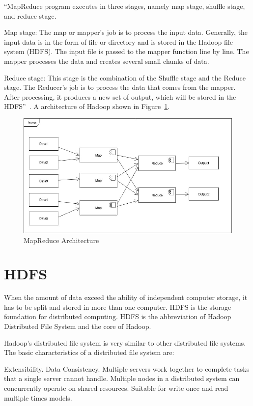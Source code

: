 ``MapReduce program executes in three stages, namely map stage, shuffle stage, 
and reduce stage.

Map stage: The map or mapper's job is to process the input data. Generally, the 
input data is in the form of file or directory and is stored in the Hadoop file 
system (HDFS). The input file is passed to the mapper function line by line. The 
mapper processes the data and creates several small chunks of data.

Reduce stage: This stage is the combination of the Shuffle stage and the Reduce 
stage. The Reducer's job is to process the data that comes from the mapper. After 
processing, it produces a new set of output, which will be stored in the HDFS''~\cite{hid-sp18-508-mapreduce}.
A architecture of Hadoop shown in Figure~\ref{f:fly}.

\begin{figure}[!ht]
  \centering\includegraphics[width=\columnwidth]{images/mapReduce.jpg}
  \caption{MapReduce Architecture}\label{f:fly}
\end{figure}

\section{HDFS}
When the amount of data exceed the ability of independent computer storage, it 
has to be split and stored in more than one computer. HDFS is the storage 
foundation for distributed computing. HDFS is the abbreviation of Hadoop 
Distributed File System and the core of Hadoop. 

Hadoop's distributed file system is very similar to other distributed file 
systems. The basic characteristics of a distributed file system are: 

Extensibility.
Data Consistency.
Multiple servers work together to complete tasks that a single server cannot handle.
Multiple nodes in a distributed system can concurrently operate on shared resources.
Suitable for write once and read multiple times models.

